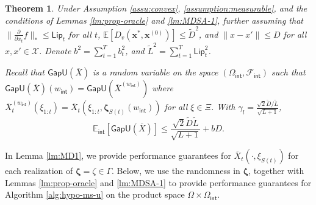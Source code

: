 \documentclass[11pt,fullpage,letterpaper]{article}
\newcommand{\mc}{\mathcal}
\newcommand{\mb}{\mathbf}
\newcommand{\E}{\mathbb{E}}
\newcommand{\bz}{\boldsymbol{\zeta}}
\newcommand{\internal}{\mathsf{int}}
\newcommand{\gapu}{\mathsf{GapU}}
\newcommand{\lips}{\mathsf{Lip}}
\newtheorem{theorem}{Theorem}[section]
\begin{document}
\begin{theorem}\label{thm:MDSA-1}
Under Assumption \ref{assu:convex}, \ref{assumption:measurable}, and the conditions of Lemmas \ref{lm:prop-oracle} and \ref{lm:MDSA-1}, further assuming that $\|\frac{\partial}{\partial x_t} f\|_*\leq \lips_t$ for all $t$, $\E[D_v(\mb x^*,\mb x^{(0)})]\leq \tilde{D}^2$, and $\|x-x'\|\leq D$ for all $x,x'\in \mc X$. Denote $b^2 = \sum_{t=1}^T b_t^2$, and $\tilde{L}^2 = \sum_{t=1}^T \lips_t^2$. 

Recall that $\gapu(\overline{X})$ is a random variable on the space $(\Omega_{\internal},\mc F_{\internal})$ such that $\gapu(\overline{X})(w_{\internal}) = \gapu(\overline{X}^{(w_{\internal})})$ where $\overline{X}_t^{(w_{\internal})}(\xi_{1:t}) = \overline{X}_t(\xi_{1:t},\bz_{S(t)}(w_{\internal}))$ for all $\xi\in \Xi$. With $\gamma_l = \frac{\sqrt{2}\tilde{D}/\tilde{L}}{\sqrt{L+1}}$,
\begin{equation}\label{eq:convergence-in-exp}
\E_{\internal}[\gapu(\overline{X})] \leq \frac{\sqrt{2}\tilde{D}\tilde{L}}{\sqrt{L+1}}+bD.
\end{equation}


\end{theorem}
In Lemma \ref{lm:MD1}, we provide performance guarantees for $\overline{X}_t(\cdot,\xi_{S(t)})$ for each realization of $\bz = \zeta\in \Gamma$. Below, we use the randomness in $\bz$, together with Lemmas \ref{lm:prop-oracle} and \ref{lm:MDSA-1} to provide performance guarantees for Algorithm \ref{alg:hypo-ms-u} on the product space $\Omega\times\Omega_{\internal}$. 
\end{document}

